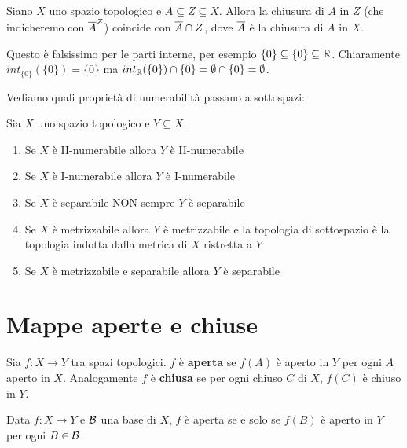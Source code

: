 \begin{multicols*}{2}
\begin{lemma}\label{ChiusuraInSottospazi}
Siano $X$ uno spazio topologico e $A\subseteq Z\subseteq X$. Allora la chiusura di $A$ in $Z$ (che indicheremo con $\overline{A}^Z$) coincide con $\overline{A}\cap Z$, dove $\overline{A}$ è la chiusura di $A$ in $X$.
\end{lemma}
\begin{remark}
Questo è falsissimo per le parti interne, per esempio $\{0\}\subseteq \{0\}\subseteq \mathbb{R}$. Chiaramente $int_{\{0\}}(\{0\})=\{0\}$ ma $int_{\mathbb{R}}(\{0\})\cap \{0\}=\emptyset\cap \{0\}=\emptyset$.
\end{remark}
\vspace{0.5cm}

\noindent
Vediamo quali proprietà di numerabilità passano a sottospazi:
\begin{proposition}
Sia $X$ uno spazio topologico e $Y\subseteq X$.
\begin{enumerate}[noitemsep]
\item Se $X$ è II-numerabile allora $Y$ è II-numerabile
\item Se $X$ è I-numerabile allora $Y$ è I-numerabile
\item Se $X$ è separabile NON sempre $Y$ è separabile
\item Se $X$ è metrizzabile allora $Y$ è metrizzabile e la topologia di sottospazio è la topologia indotta dalla metrica di $X$ ristretta a $Y$
\item Se $X$ è metrizzabile e separabile allora $Y$ è separabile
\end{enumerate}
\end{proposition}


\section{Mappe aperte e chiuse}
\begin{definition}
Sia $f:X\to Y$ tra spazi topologici. $f$ è \textbf{aperta} se $f(A)$ è aperto in $Y$ per ogni $A$ aperto in $X$. Analogamente $f$ è \textbf{chiusa} se per ogni chiuso $C$ di $X$, $f(C)$ è chiuso in $Y$.
\end{definition}

\begin{lemma}\label{FunzioneAPertaSSEApertaSuBase}
Data $f:X\to Y$ e $\mathcal{B}$ una base di $X$, $f$ è aperta se e solo se $f(B)$ è aperto in $Y$ per ogni $B\in \mathcal{B}$.
\end{lemma}



\end{multicols*}
